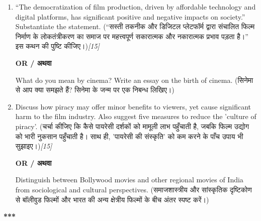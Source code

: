 \documentclass[11pt,a4paper]{article}
\newcommand{\pts}[1]{\hfill \textit{[#1]}}
\begin{document}
\begin{enumerate}[label=\textbf{\arabic*.}, start=5]
  \item ``The democratization of film production, driven by affordable technology and digital platforms, has significant positive and negative impacts on society.'' Substantiate the statement. (``सस्ती तकनीक और डिजिटल प्लेटफॉर्म द्वारा संचालित फिल्म निर्माण के लोकतंत्रीकरण का समाज पर महत्त्वपूर्ण सकारात्मक और नकारात्मक प्रभाव पड़ता है।'' इस कथन की पुष्टि कीजिए।)\pts{15}\\
  \begin{center}\textbf{OR / अथवा}\end{center}
  What do you mean by cinema? Write an essay on the birth of cinema. (सिनेमा से आप क्या समझते हैं? सिनेमा के जन्म पर एक निबन्ध लिखिए।)

  \item Discuss how piracy may offer minor benefits to viewers, yet cause significant harm to the film industry. Also suggest five measures to reduce the 'culture of piracy'. (चर्चा कीजिए कि कैसे पायरेसी दर्शकों को मामूली लाभ पहुँचाती है, जबकि फिल्म उद्योग को भारी नुकसान पहुँचाती है। साथ ही, 'पायरेसी की संस्कृति' को कम करने के पाँच उपाय भी सुझाइए।)\pts{15}\\
  \begin{center}\textbf{OR / अथवा}\end{center}
  Distinguish between Bollywood movies and other regional movies of India from sociological and cultural perspectives. (समाजशास्त्रीय और सांस्कृतिक दृष्टिकोण से बॉलीवुड फिल्मों और भारत की अन्य क्षेत्रीय फिल्मों के बीच अंतर स्पष्ट करें।)
\end{enumerate}

\bigskip
\begin{center}
  \textbf{***}
\end{center}
\end{document}
